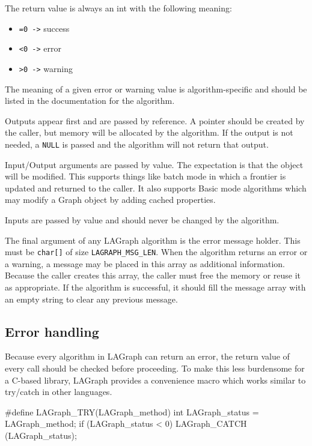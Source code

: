 The return value is always an int with the following meaning:

\begin{itemize}
    \item \verb'=0 ->' success
    \item \verb'<0 ->' error
    \item \verb'>0 ->' warning
\end{itemize}

The meaning of a given error or warning value is algorithm-specific
and should be listed in the documentation for the algorithm.

Outputs appear first and are passed by reference. A pointer should be created by the caller, but
memory will be allocated by the algorithm. If the output is not needed, a \verb'NULL' is passed and the
algorithm will not return that output.

Input/Output arguments are passed by value. The expectation is that the object will be modified.
This supports things like batch mode in which a frontier is updated and returned to the caller.
It also supports Basic mode algorithms which may modify a Graph object by adding cached properties.

Inputs are passed by value and should never be changed by the algorithm.

The final argument of any LAGraph algorithm is the error message holder. This must be \verb'char[]' of
size \verb'LAGRAPH_MSG_LEN'. When the algorithm returns an error or a warning, a message may be placed in
this array as additional information. Because the caller creates this array, the caller must free
the memory or reuse it as appropriate. If the algorithm is successful, it should fill the message array
with an empty string to clear any previous message.


\subsection{Error handling}

Because every algorithm in LAGraph can return an error, the return value of every call should be
checked before proceeding. To make this less burdensome for a C-based library, LAGraph provides a
convenience macro which works similar to try/catch in other languages.

\begin{cplus}
#define LAGraph_TRY(LAGraph_method)
{
    int LAGraph_status = LAGraph_method;
    if (LAGraph_status < 0)
    {
        LAGraph_CATCH (LAGraph_status);
    }
}
\end{cplus}


